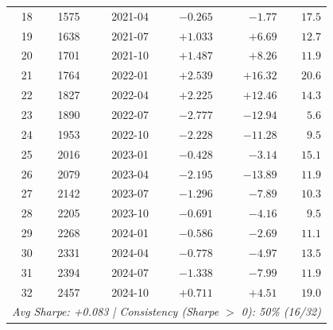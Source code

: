 \begin{table}[t]
\begin{tabular}{rrrrrr}
\rowcolor{gray!10}18 & 1575 & 2021-04 & $-0.265$ & $-1.77$ & $17.5$ \\
19 & 1638 & 2021-07 & $+1.033$ & $+6.69$ & $12.7$ \\
20 & 1701 & 2021-10 & $+1.487$ & $+8.26$ & $11.9$ \\
21 & 1764 & 2022-01 & $+2.539$ & $+16.32$ & $20.6$ \\
22 & 1827 & 2022-04 & $+2.225$ & $+12.46$ & $14.3$ \\
\rowcolor{gray!10}23 & 1890 & 2022-07 & $-2.777$ & $-12.94$ & $5.6$ \\
\rowcolor{gray!10}24 & 1953 & 2022-10 & $-2.228$ & $-11.28$ & $9.5$ \\
\rowcolor{gray!10}25 & 2016 & 2023-01 & $-0.428$ & $-3.14$ & $15.1$ \\
\rowcolor{gray!10}26 & 2079 & 2023-04 & $-2.195$ & $-13.89$ & $11.9$ \\
\rowcolor{gray!10}27 & 2142 & 2023-07 & $-1.296$ & $-7.89$ & $10.3$ \\
\rowcolor{gray!10}28 & 2205 & 2023-10 & $-0.691$ & $-4.16$ & $9.5$ \\
\rowcolor{gray!10}29 & 2268 & 2024-01 & $-0.586$ & $-2.69$ & $11.1$ \\
\rowcolor{gray!10}30 & 2331 & 2024-04 & $-0.778$ & $-4.97$ & $13.5$ \\
\rowcolor{gray!10}31 & 2394 & 2024-07 & $-1.338$ & $-7.99$ & $11.9$ \\
32 & 2457 & 2024-10 & $+0.711$ & $+4.51$ & $19.0$ \\
\midrule
\multicolumn{6}{l}{\textit{Avg Sharpe: +0.083 | Consistency (Sharpe $>$ 0): 50\% (16/32)}} \\
\bottomrule
\end{tabular}
\end{table}
